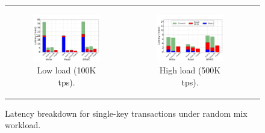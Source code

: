 \begin{figure}[hbt]
\centering
\begin{tabular}{ccc}
      \begin{subfigure}[t]{0.48\textwidth}
         \includegraphics[width=\textwidth]{figs/latency_allPUTGET.pdf}
        \caption[]{Low load (100K tps).}
        \label{fig:stack-brc}

      \end{subfigure} 
    
& 
      \begin{subfigure}[t]{0.48\textwidth}
      	\includegraphics[width=\textwidth]{figs/latencyHighThrough_PUTGETRMW.pdf}
	\caption{High load (500K tps).}
	\label{fig:hightx}
      \end{subfigure}  & 

\end{tabular}
       \caption{Latency breakdown  for single-key transactions under  random mix workload. }
\end{figure}


